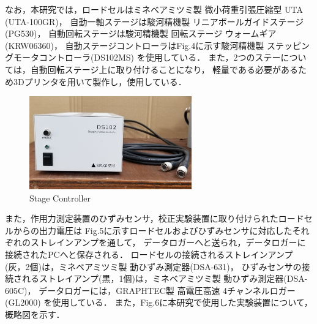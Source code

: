 なお，本研究では，ロードセルはミネベアミツミ製 微小荷重引張圧縮型 UTA (UTA-100GR)，
自動一軸ステージは駿河精機製 リニアボールガイドステージ (PG530)，
自動回転ステージは駿河精機製 回転ステージ ウォームギア (KRW06360)，
自動ステージコントローラはFig.4に示す駿河精機製 ステッピングモータコントローラ(DS102MS) を使用している．
また，2つのステーについては，自動回転ステージ上に取り付けることになり，
軽量である必要があるため3Dプリンタを用いて製作し，使用している．

\begin{figure}[htbp]
    \footnotesize
    \begin{center}
        \includegraphics[width=70mm]{images/22-4.png}
        \caption{Stage Controller}
    \end{center}
\end{figure}

\newpage

また，作用力測定装置のひずみセンサ，校正実験装置に取り付けられたロードセルからの出力電圧は
Fig.5に示すロードセルおよびひずみセンサに対応したそれぞれのストレインアンプを通して，
データロガーへと送られ，データロガーに接続されたPCへと保存される．
ロードセルの接続されるストレインアンプ(灰，2個)は，ミネベアミツミ製 動ひずみ測定器(DSA-631)，
ひずみセンサの接続されるストレイアンプ(黒，1個)は，ミネベアミツミ製 動ひずみ測定器(DSA-605C)，
データロガーには，GRAPHTEC製 高電圧高速 4チャンネルロガー(GL2000) を使用している．
また，Fig.6に本研究で使用した実験装置について，概略図を示す．

